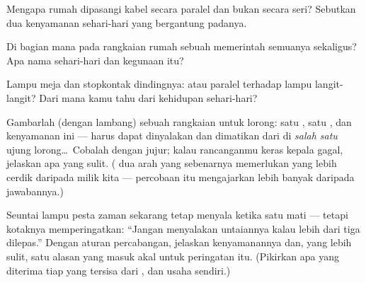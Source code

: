 \begin{exercise}[$\star$]\label{exo:g5:series-parallel-circuits:6}
Mengapa rumah dipasangi kabel secara paralel dan bukan secara seri?
Sebutkan dua kenyamanan sehari-hari yang bergantung padanya.
\end{exercise}

\begin{exercise}[$\star$]\label{exo:g5:series-parallel-circuits:7}
Di bagian mana pada rangkaian rumah sebuah  memerintah semuanya
sekaligus? Apa nama sehari-hari dan kegunaan  itu?
\end{exercise}

\begin{exercise}[$\star$]\label{exo:g5:series-parallel-circuits:8}
Lampu meja dan stopkontak dindingnya:  atau paralel
terhadap lampu langit-langit? Dari mana kamu tahu dari kehidupan
sehari-hari?
\end{exercise}

\begin{exercise}[$\star\star$]\label{exo:g5:series-parallel-circuits:9}
Gambarlah (dengan lambang) sebuah rangkaian untuk lorong: satu
, satu , dan kenyamanan ini ---  harus dapat
dinyalakan dan dimatikan dari  di \emph{salah satu} ujung
lorong\dots\ Cobalah dengan jujur; kalau rancanganmu keras kepala
gagal, jelaskan apa yang sulit. ( dua arah yang sebenarnya
memerlukan  yang lebih cerdik daripada milik kita --- percobaan
itu mengajarkan lebih banyak daripada jawabannya.)
\end{exercise}

\begin{exercise}[$\star\star$]\label{exo:g5:series-parallel-circuits:10}
Seuntai lampu pesta zaman sekarang tetap menyala ketika satu 
mati --- tetapi kotaknya memperingatkan: ``Jangan menyalakan
untaiannya kalau lebih dari tiga  dilepas.'' Dengan aturan
percabangan, jelaskan kenyamanannya dan, yang lebih sulit, satu alasan
yang masuk akal untuk peringatan itu. (Pikirkan apa yang diterima tiap
 yang tersisa dari , dan usaha  sendiri.)
\end{exercise}

